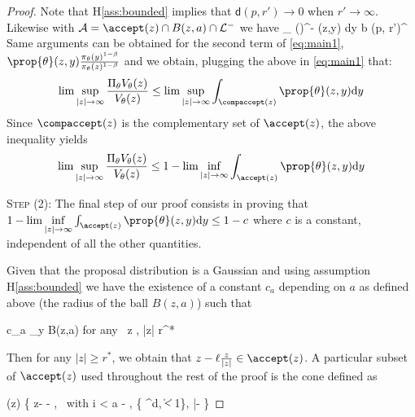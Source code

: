 \documentclass[10pt,twocolumn,letterpaper]{article}
\begin{document}
\begin{proof}
Note that H\ref{ass:bounded} implies that $\mathsf{d}(p, r') \to 0$ when $r' \to \infty$.
Likewise with  $\mathcal{A} = \accept(z) \cap B(z,a) \cap \mathcal{L}^-$ we have
\beq
\int_{} ()^{-\beta} \prop{\theta}(z,y) \textrm{d}y  \leq b (p, r')^{\beta} 
\eeq
Same arguments can be obtained for the second term of \eqref{eq:main1}, \ie $\prop{\theta}(z,y) \frac{\pi_\theta(y)^{1-\beta}}{\pi_\theta(z)^{1-\beta}}$ and we obtain, plugging the above in \eqref{eq:main1} that:
\begin{align}
\lim \sup \limits_{|z| \to \infty}  \frac{\Pi_\theta V_\theta(z)}{V_\theta(z)} \leq \lim \sup \limits_{|z| \to \infty}  \int_{\compaccept(z)} \prop{\theta}(z,y)  \textrm{d}y
\end{align}
Since $\compaccept(z)$ is the complementary set of $\accept(z)$, the above inequality yields
\begin{align}
\lim \sup \limits_{|z| \to \infty}  \frac{\Pi_\theta V_\theta(z)}{V_\theta(z)} \leq 1 - \lim \inf \limits_{|z| \to \infty}  \int_{\accept(z)} \prop{\theta}(z,y)  \textrm{d}y
\end{align}



\medskip
\noindent \textsc{Step (2): } The final step of our proof consists in proving that $1 - \lim \inf \limits_{|z| \to \infty}  \int_{\accept(z)} \prop{\theta}(z,y)  \textrm{d}y \leq 1 - c$ where $c$ is a constant, independent of all the other quantities.


Given that the proposal distribution is a Gaussian and using assumption H\ref{ass:bounded} we have the existence of a constant $c_a$ depending on $a$ as defined above (the radius of the ball $B(z,a)$) such that

\beq\label{eq:gauss}
 \leq  c_a \leq \inf \limits_{y \in B(z,a)}  \quad \textrm{for any} \, z \in \zset, |z| \geq r^*
\eeq

Then for any $|z| \geq r^*$, we obtain that $z- \ell \frac{z}{|z|} \in \accept(z)$.
A particular subset of $\accept(z)$ used throughout the rest of the proof is the cone defined as 

\beq\label{eq:defcone}
(z) \eqdef \{ z- \ell {} - \kappa \nu , \, \textrm{with} \quad i < a - \ell  , \nu \in \{ \nu \in \rset^d, \| \nu \| < 1\}, |\nu -  \leq {}   \}
\eeq


\end{proof}
\end{document}

